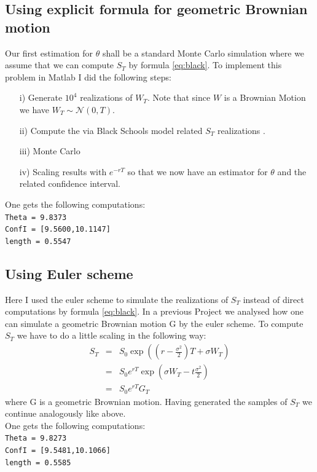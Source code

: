 \documentclass[12pt,a4paper]{scrartcl}
\begin{document}
\subsection{Using explicit formula for geometric Brownian motion}
Our first estimation for $\theta$ shall be a standard Monte Carlo simulation where we assume that we can compute $S_T$ by formula \ref{eq:black}.
To implement this problem in Matlab I did the following steps:
\begin{itemize}
\item[i)] Generate $10^4$ realizations of $W_T$. Note that since $W$ is a Brownian Motion we have $W_T \sim \mathcal{N}(0,T)$.
\item[ii)] Compute the via Black Schools model related $S_T$ realizations .
\item[iii)] Monte Carlo
\item[iv)] Scaling results with $e^{-rT}$ so that we now have an estimator for $\theta$ and the related confidence interval.
\end{itemize}

\noindent One gets the following computations:\\
\texttt{Theta = 9.8373}\\
\texttt{ConfI = [9.5600,10.1147]}\\
\texttt{length = 0.5547} 

\subsection{Using Euler scheme}
Here I used the euler scheme to simulate the realizations of $S_T$ instead of direct computations by formula \ref{eq:black}. In a previous Project we analysed how one can simulate a geometric Brownian motion G by the euler scheme. To compute $S_T$ we have to do a little scaling in the following way:
\begin{eqnarray*}
S_T &=& S_0 \exp{\left( \left(  r- \frac{\sigma^2}{2}\right)T + \sigma W_T\right)} \\
&=& S_0 e^{rT} \exp{\left( \sigma W_T - t \frac{\sigma^2}{2} \right)}\\
&=& S_0 e^{rT} G_T
\end{eqnarray*}
where G is a geometric Brownian motion.
Having generated the samples of $S_T$ we continue analogously like above. \\

\noindent One gets the following computations:\\
\texttt{Theta = 9.8273}\\
\texttt{ConfI = [9.5481,10.1066]} \\
\texttt{length = 0.5585} 
\end{document}
